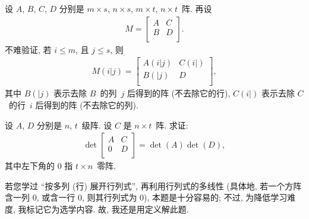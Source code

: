 \documentclass[%
    UTF8,%
    fontset=none,%
    punct=kaiming,%
    zihao=-4,%
    a4paper,%
    oneside,%
]{ctexbook}
\renewcommand*{\leq}{\leqslant}
\begin{document}
设 \(A\), \(B\), \(C\), \(D\)
分别是 \(m \times s\), \(n \times s\),
\(m \times t\), \(n \times t\)~阵.
再设
\begin{align*}
    M = \begin{bmatrix}
            A & C \\
            B & D \\
        \end{bmatrix}.
\end{align*}
不难验证, 若 \(i \leq m\), 且 \(j \leq s\),
则
\begin{align*}
    M(i|j)
    =
    \begin{bmatrix}
        A(i|j) & C(i|) \\
        B(|j)  & D     \\
    \end{bmatrix},
\end{align*}
其中 \(B(|j)\) 表示去除 \(B\)~的列~\(j\) 后得到的阵
(不去除它的行),
\(C(i|)\) 表示去除 \(C\)~的行~\(i\) 后得到的阵
(不去除它的列).

\begin{example}
    设 \(A\), \(D\) 分别是 \(n\), \(t\)~级阵.
    设 \(C\) 是 \(n \times t\)~阵.
    求证:
    \begin{align*}
        \det {
            \begin{bmatrix}
                A & C \\
                0 & D \\
            \end{bmatrix}
        }
        = \det {(A)} \det {(D)},
    \end{align*}
    其中左下角的 \(0\) 指 \(t \times n\)~零阵.
\end{example}

若您学过 ``按多列 (行) 展开行列式'',
再利用行列式的多线性
(具体地, 若一个方阵含一列 \(0\), 或含一行 \(0\),
则其行列式为 \(0\)),
本题是十分容易的;
不过, 为降低学习难度,
我标记它为选学内容.
故, 我还是用定义解此题.
\end{document}
